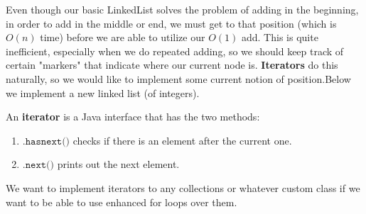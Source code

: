 \documentclass{article}
\begin{document}
    Even though our basic LinkedList solves the problem of adding in the beginning, in order to add in the middle or end, we must get to that position (which is $O(n)$ time) before we are able to utilize our $O(1)$ add. This is quite inefficient, especially when we do repeated adding, so we should keep track of certain "markers" that indicate where our current node is. \textbf{Iterators} do this naturally, so we would like to implement some current notion of position.Below we implement a new linked list (of integers). 

    \begin{definition}[Iterator]
    An \textbf{iterator} is a Java interface that has the two methods: 
    \begin{enumerate}
        \item $\texttt{.hasnext()}$ checks if there is an element after the current one. 
        \item $\texttt{.next()}$ prints out the next element. 
    \end{enumerate}
    We want to implement iterators to any collections or whatever custom class if we want to be able to use enhanced for loops over them. 
    \end{definition}
\end{document}
